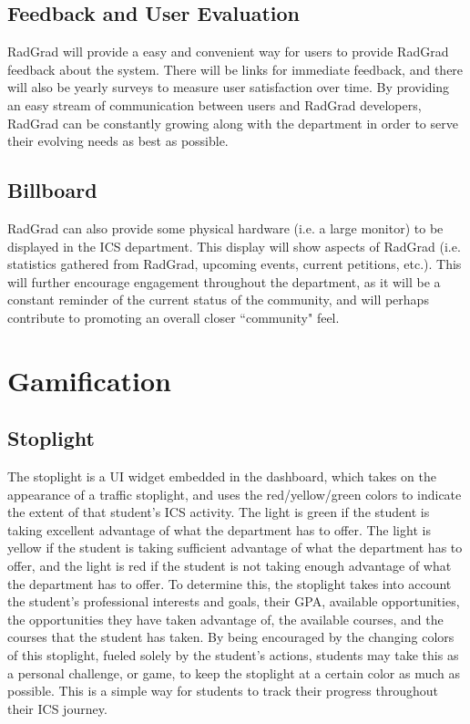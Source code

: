 \subsection{Feedback and User Evaluation}
RadGrad will provide a easy and convenient way for users to provide RadGrad feedback about the system. There will be links for immediate feedback, and there will also be yearly surveys to measure user satisfaction over time. By providing an easy stream of communication between users and RadGrad developers, RadGrad can be constantly growing along with the department in order to serve their evolving needs as best as possible.
\subsection{Billboard}
RadGrad can also provide some physical hardware (i.e. a large monitor) to be displayed in the ICS department. This display will show aspects of RadGrad (i.e. statistics gathered from RadGrad, upcoming events, current petitions, etc.). This will further encourage engagement throughout the department, as it will be a constant reminder of the current status of the community, and will perhaps contribute to promoting an overall closer ``community" feel. 

\section{Gamification}
\subsection{Stoplight}
The stoplight is a UI widget embedded in the dashboard, which takes on the appearance of a traffic stoplight, and uses the red/yellow/green colors to indicate the extent of that student's ICS activity. The light is green if the student is taking excellent advantage of what the department has to offer. The light is yellow if the student is taking sufficient advantage of what the department has to offer, and the light is red if the student is not taking enough advantage of what the department has to offer. To determine this, the stoplight takes into account the student's professional interests and goals, their GPA, available opportunities, the opportunities they have taken advantage of, the available courses, and the courses that the student has taken. By being encouraged by the changing colors of this stoplight, fueled solely by the student's actions, students may take this as a personal challenge, or game, to keep the stoplight at a certain color as much as possible. This is a simple way for students to track their progress throughout their ICS journey.
